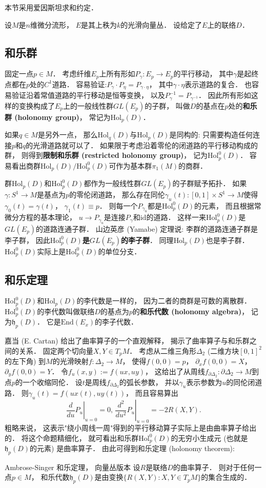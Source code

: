 
本节采用爱因斯坦求和约定．

设$M$是$n$维微分流形， $E$是其上秩为$k$的光滑向量丛． 设给定了$E$上的联络$D$．

\subsection{和乐群}
固定一点$p\in M$． 考虑纤维$E_p$上所有形如$P_\gamma:E_p\to E_p$的平行移动， 其中$\gamma$是起终点都在$p$处的$C^1$道路． 容易验证:$P_\gamma\cdot P_\eta=P_{\gamma\cdot\eta}$，
其中$\gamma\cdot\eta$表示道路的复合． 也容易验证沿着常值道路的平行移动是恒等变换， 以及$P_\gamma^{-1}=P_{\gamma^{-1}}$． 因此所有形如这样的变换构成了$E_p$上的一般线性群$GL(E_p)$的子群， 叫做$D$的基点在$p$处的\textbf{和乐群 (holonomy group)}， 常记为$\text{Hol}_p(D)$． 

如果$q\in M$是另外一点， 那么$\text{Hol}_q(D)$与$\text{Hol}_p(D)$是同构的: 只需要构造任何连接$p$和$q$的光滑道路就可以了． 如果限于考虑沿着零伦的闭道路的平行移动构成的群， 则得到\textbf{限制和乐群 (restricted holonomy group)}， 记为$\text{Hol}^0_p(D)$． 容易看出商群$\text{Hol}_p(D)/\text{Hol}_p^0(D)$可作为基本群$\pi_1(M)$的商群．

群$\text{Hol}_p(D)$和$\text{Hol}_p^0(D)$都作为一般线性群$GL(E_p)$的子群赋予拓扑． 如果$\gamma:S^1\to M$是基点为$p$的零伦闭道路， 那么存在同伦$\gamma_u(t):[0,1]\times S^1\to M$使得$\gamma_0(t)=\gamma(t)$， $\gamma_1(t)\equiv p$． 则每一个$P_{\gamma_u}$都是$\text{Hol}_p^0(D)$的元素， 而且根据常微分方程的基本理论， $u\to P_{\gamma_u}$是连接$P_\gamma$和$\text{id}$的道路． 这样一来$\text{Hol}_p^0(D)$是$GL(E_p)$的道路连通子群． 山边英彦 (Yamabe) 定理说: 李群的道路连通子群是李子群， 因此\textbf{$\text{Hol}_p^0(D)$是$GL(E_p)$的李子群}． 同理$\text{Hol}_p(D)$也是李子群． $\text{Hol}_p^0(D)$实际上是$\text{Hol}_p^0(D)$的单位分支．

\subsection{和乐定理}
$\text{Hol}_p^0(D)$和$\text{Hol}_p(D)$的李代数是一样的， 因为二者的商群是可数的离散群． $\text{Hol}_p^0(D)$的李代数叫做联络$D$的基点为$p$的\textbf{和乐代数 (holonomy algebra)}， 记为$\mathfrak{h}_p(D)$．  它是$\text{End}(E_x)$的李子代数． 

嘉当 (E. Cartan) 给出了曲率算子的一个直观解释， 揭示了曲率算子与和乐群之间的关系． 固定两个切向量$X,Y\in T_pM$． 考虑从二维三角形$\Delta_2$ (二维方块$[0,1]^2$的左下角) 到$M$的光滑映射$f:\Delta_2\to M$， 使得$f(0,0)=p$， $\partial_xf(0,0)=X$， $\partial_yf(0,0)=Y$． 令$f_u(x,y):=f(ux,uy)$， 这给出了从周线$f_{\partial\Delta_2}:\partial\Delta_2\to M$到点$p$的一个收缩同伦． 设$t$是周线$f_{\partial\Delta_2}$的弧长参数， 并以$\gamma_u$表示参数为$u$的同伦闭道路． 则$\gamma_u(t)=f(ux(t),uy(t))$， 而且容易算出
$$
\left.\frac{d}{du}P_u\right|_{u=0}=0,\,\left.\frac{d^2}{du^2}P_u\right|_{u=0}=-2R(X,Y).
$$
粗略来说， 这表示"绕小周线一周"得到的平行移动算子实际上是由曲率算子给出的． 将这个命题精细化， 就可看出和乐群$\text{Hol}_p^0(D)$的无穷小生成元 (也就是$\mathfrak{h}_p(D)$的元素) 是曲率算子． 由此可得到和乐定理 (holonomy theorem):

\begin{theorem}{Ambrose-Singer 和乐定理， 向量丛版本}
设$R$是联络$D$的曲率算子． 则对于任何一点$p\in M$， 和乐代数$\mathfrak{h}_p(D)$是由变换$\{R(X,Y):X,Y\in T_pM\}$的集合生成的．
\end{theorem}
